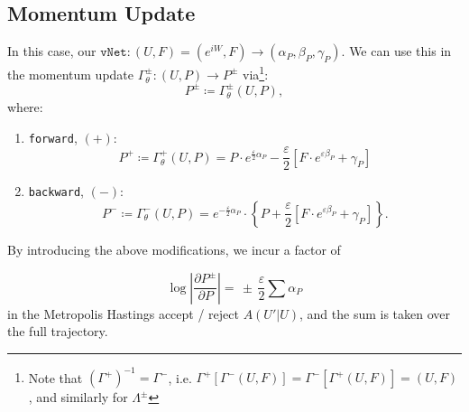 \documentclass[a4paper,11pt]{article}
\begin{document}
\subsection{\label{sec:momentum-update}Momentum Update}
%
In this case, our $\texttt{vNet}: (U, F) = (e^{iW}, F) \rightarrow (\alpha_{P},
\beta_{P}, \gamma_{P})$.
%
We can use this in the momentum update $\Gamma^{\pm}_{\theta}: (U, P) \rightarrow P^{\pm}$
via\footnote{Note that $\left(\Gamma^{+}\right)^{-1} = \Gamma^{-}$, i.e.
$\Gamma^{+}\left[\Gamma^{-}(U, F)\right] = \Gamma^{-}\left[\Gamma^{+}(U,
F)\right] = (U, F)$, and similarly for $\Lambda^{\pm}$}:
%
\begin{equation}
    P^{\pm} \coloneqq \Gamma_{\theta}^{\pm}(U, P),
\end{equation}
%
where:
%
\begin{enumerate}
    \item \texttt{forward}, $(+)$:
    \begin{equation}
        P^{+} \coloneqq \Gamma_{\theta}^{+}(U, P) = P \cdot e^{\frac{\varepsilon}{2} \alpha_{P}} - \frac{\varepsilon}{2}\left[ F \cdot e^{\varepsilon \beta_{P}} + \gamma_{P} \right]
    \end{equation}
    \item \texttt{backward}, $(-)$:
    \begin{equation}
        P^{-} \coloneqq \Gamma_{\theta}^{-}(U, P) = e^{-\frac{\varepsilon}{2} \alpha_{P}} \cdot \left\{P + \frac{\varepsilon}{2} \left[ F \cdot e^{\varepsilon \beta_{P}} + \gamma_{P} \right] \right\}.
    \end{equation}
\end{enumerate}
%
By introducing the above modifications, we incur a factor of

\begin{equation}
    \log\left|\frac{\partial P^{\pm}}{\partial P}\right| = \, \pm \, \frac{\varepsilon}{2}\sum \alpha_{P}
\end{equation}
%
in the Metropolis Hastings accept / reject $A(U'|U)$, and the sum is taken over the full trajectory.
%
\end{document}
